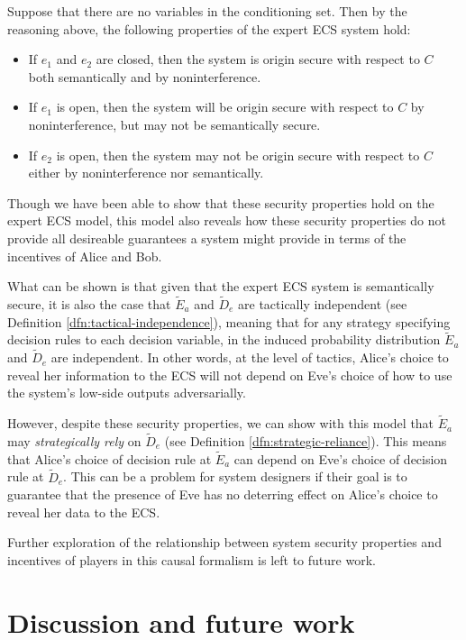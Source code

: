 \documentclass[../thesis.tex]{subfiles}
\begin{document}
Suppose that there are no variables in the conditioning
set.
Then by the reasoning above, the following properties
of the expert ECS system hold:
\begin{itemize}
\item If $e_1$ and $e_2$ are closed, then the system is
  origin secure with respect to $C$ both semantically
  and by noninterference.
\item If $e_1$ is open, then the system will be origin
  secure with respect to $C$ by noninterference, but may not
  be semantically secure.
\item If $e_2$ is open, then the system may not be origin secure
  with respect to $C$ either by noninterference nor semantically.
\end{itemize}

Though we have been able to show that these security
properties hold on the expert ECS model, this model
also reveals how these security properties do not
provide all desireable guarantees a system might
provide in terms of the incentives of Alice and Bob.

What can be shown is that given that the expert ECS
system is semantically secure, it is also the case
that $\tilde{E}_a$ and $\tilde{D}_e$ are tactically
independent (see Definition \ref{dfn:tactical-independence}),
meaning that for any strategy specifying decision rules
to each decision variable, in the induced probability
distribution $\tilde{E}_a$ and $\tilde{D}_e$ are independent.
In other words, at the level of tactics, Alice's choice to
reveal her information to the ECS will not depend on Eve's
choice of how to use the system's low-side outputs
adversarially.

However, despite these security properties,
we can show with this model that $\tilde{E}_a$
may \emph{strategically rely} on $\tilde{D}_e$
(see Definition \ref{dfn:strategic-reliance}).
This means that Alice's choice of decision rule 
at $\tilde{E}_a$ can depend on Eve's choice of
decision rule at $\tilde{D}_e$.
This can be a problem for system designers if
their goal is to guarantee that the presence of
Eve has no deterring effect on Alice's choice
to reveal her data to the ECS.

Further exploration of the relationship between
system security properties and incentives of
players in this causal formalism is left to
future work.

\section{Discussion and future work}
\label{sec:future}
\end{document}
